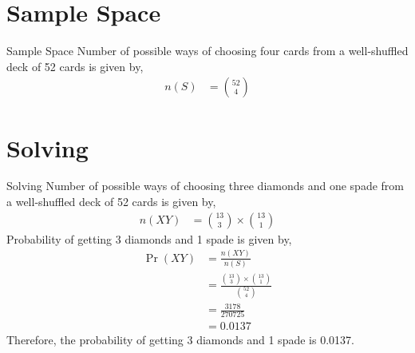 \documentclass{beamer}
\providecommand{\pr}[1]{\ensuremath{\Pr\left(#1\right)}}
\begin{document}
\section{Sample Space}
\begin{frame}{Sample Space}
Number of possible ways of choosing four cards from a well-shuffled deck of 52 cards is given by,
   \begin{align}
        n(S) &= {52 \choose 4}
   \end{align}
\end{frame}  

\section{Solving}
\begin{frame}{Solving}
Number of possible ways of choosing three diamonds and one spade from a well-shuffled deck of 52 cards is given by,
   \begin{align}
        n(X Y) &= {13 \choose 3} \times {13 \choose 1}
   \end{align}
Probability of getting 3 diamonds and 1 spade is given by,
	\begin{align}
	\pr{X Y} &= \frac{n(X Y)}{n(S)} \\
	&= \frac{{13 \choose 3} \times {13 \choose 1}}{{52 \choose 4}} \\
	&= \frac{3178}{270725} \\
	&= 0.0137
	\end{align}
Therefore, the probability of getting 3 diamonds and 1 spade is 0.0137.
\end{frame}
\end{document}
